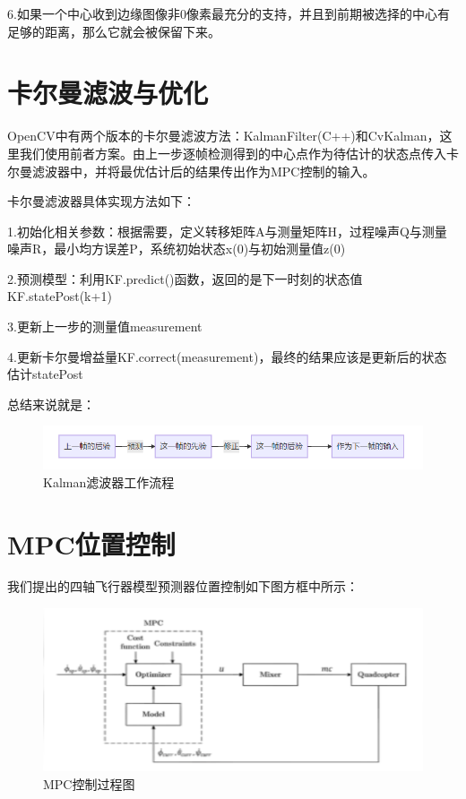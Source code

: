 6.如果⼀个中心收到边缘图像⾮0像素最充分的支持，并且到前期被选择的中心有足够的距离，那么它就会被保留下来。

\section{卡尔曼滤波与优化}

OpenCV中有两个版本的卡尔曼滤波方法：KalmanFilter(C++)和CvKalman，这里我们使用前者方案。由上一步逐帧检测得到的中心点作为待估计的状态点传入卡尔曼滤波器中，并将最优估计后的结果传出作为MPC控制的输入。

卡尔曼滤波器具体实现方法如下：

1.初始化相关参数：根据需要，定义转移矩阵A与测量矩阵H，过程噪声Q与测量噪声R，最小均方误差P，系统初始状态x(0)与初始测量值z(0)

2.预测模型：利用KF.predict()函数，返回的是下一时刻的状态值KF.statePost(k+1)

3.更新上一步的测量值measurement

4.更新卡尔曼增益量KF.correct(measurement)，最终的结果应该是更新后的状态估计statePost

总结来说就是：

\begin{figure}[ht]
  \centering
  \includegraphics[width=0.8\linewidth]{./Figure/Kalman_Process.png}
  \caption{Kalman滤波器工作流程}\label{Fig:xd1}
\end{figure}

\section{MPC位置控制}

我们提出的四轴飞行器模型预测器位置控制如下图方框中所示：

\begin{figure}[ht]
  \centering
  \includegraphics[width=0.8\linewidth]{./Figure/MPC-Diagram.png}
  \caption{MPC控制过程图}\label{Fig:xd1}
\end{figure}

